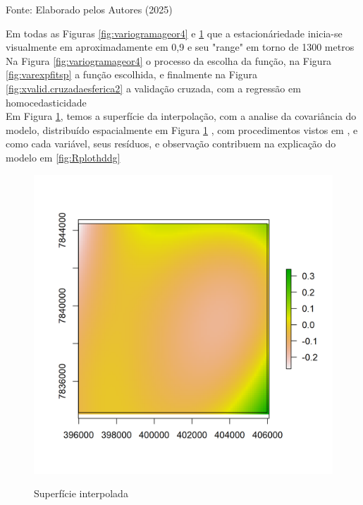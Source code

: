 			\begin{center}
				Fonte:   Elaborado pelos Autores (2025)
			\end{center}
 \hspace*{1.25 cm} 	Em todas as Figuras \ref{fig:variogramageor4} e \ref{fig:superficie-de-tendencia} que a estacionáriedade  inicia-se visualmente em aproximadamente em 0,9 e seu "range" em torno de 1300 metros\\
 \hspace*{1.25 cm} Na Figura \ref{fig:variogramageor4} o processo da escolha da função, na Figura \ref{fig:varexpfitsp} a função escolhida, e finalmente na Figura \ref{fig:xvalid.cruzadaesferica2} a validação cruzada, com a regressão em homocedasticidade\\
 \hspace*{1.25 cm} Em Figura \ref{fig:superficie-de-tendencia}, temos a superfície da interpolação, com a analise da covariância do modelo, distribuído espacialmente em Figura \ref{fig:superficie-de-tendencia} , com procedimentos vistos em   \cite[p.47]{delgado}, e como cada variável, seus resíduos, e observação contribuem na explicação do modelo em \ref{fig:Rplothddg} \\
 			\begin{minipage}[t!]{0.31\textwidth}
 				\begin{figure}[H]
 					\centering \small \caption{Superfície interpolada}
 					\includegraphics[width=0.97\linewidth]{FIGURAS/superficie}
 					\label{fig:superficie-de-tendencia}
 				\end{figure}			
 				
 			\end{minipage}\hfill
